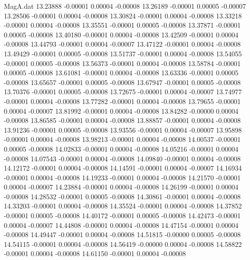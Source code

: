 \begin{filecontents}{MagA.dat}
  13.23888   -0.00001    0.00004   -0.00008
  13.26189   -0.00001    0.00005   -0.00007
  13.28506   -0.00001    0.00004   -0.00008
  13.30824   -0.00001    0.00004   -0.00008
  13.33218   -0.00001    0.00004   -0.00008
  13.35551   -0.00001    0.00005   -0.00008
  13.37871   -0.00001    0.00005   -0.00008
  13.40180   -0.00001    0.00004   -0.00008
  13.42509   -0.00001    0.00004   -0.00008
  13.44793   -0.00001    0.00004   -0.00007
  13.47122   -0.00001    0.00004   -0.00008
  13.49429   -0.00001    0.00005   -0.00008
  13.51737   -0.00001    0.00004   -0.00008
  13.54055   -0.00001    0.00005   -0.00008
  13.56373   -0.00001    0.00004   -0.00008
  13.58784   -0.00001    0.00005   -0.00008
  13.61081   -0.00001    0.00004   -0.00008
  13.63336   -0.00001    0.00005   -0.00008
  13.65657   -0.00001    0.00005   -0.00008
  13.67947   -0.00001    0.00005   -0.00008
  13.70376   -0.00001    0.00005   -0.00008
  13.72675   -0.00001    0.00004   -0.00007
  13.74977   -0.00001    0.00004   -0.00008
  13.77282   -0.00001    0.00004   -0.00008
  13.79655   -0.00001    0.00004   -0.00007
  13.81992   -0.00001    0.00004   -0.00008
  13.84282   -0.00000    0.00004   -0.00008
  13.86585   -0.00001    0.00004   -0.00008
  13.88857   -0.00001    0.00004   -0.00008
  13.91236   -0.00001    0.00005   -0.00008
  13.93556   -0.00001    0.00004   -0.00007
  13.95898   -0.00001    0.00004   -0.00008
  13.98213   -0.00001    0.00004   -0.00008
  14.00537   -0.00001    0.00005   -0.00008
  14.02833   -0.00001    0.00004   -0.00008
  14.05216   -0.00001    0.00004   -0.00008
  14.07543   -0.00001    0.00004   -0.00008
  14.09840   -0.00001    0.00004   -0.00008
  14.12172   -0.00001    0.00004   -0.00008
  14.14591   -0.00001    0.00004   -0.00007
  14.16934   -0.00001    0.00004   -0.00008
  14.19233   -0.00001    0.00004   -0.00008
  14.21570   -0.00001    0.00004   -0.00007
  14.23884   -0.00001    0.00004   -0.00008
  14.26199   -0.00001    0.00004   -0.00008
  14.28532   -0.00001    0.00005   -0.00008
  14.30861   -0.00001    0.00004   -0.00008
  14.33203   -0.00001    0.00004   -0.00008
  14.35524   -0.00001    0.00004   -0.00008
  14.37852   -0.00001    0.00005   -0.00008
  14.40172   -0.00001    0.00005   -0.00008
  14.42473   -0.00001    0.00004   -0.00007
  14.44808   -0.00001    0.00004   -0.00008
  14.47154   -0.00001    0.00004   -0.00008
  14.49447   -0.00001    0.00004   -0.00008
  14.51815   -0.00000    0.00005   -0.00008
  14.54115   -0.00001    0.00004   -0.00008
  14.56419   -0.00000    0.00004   -0.00008
  14.58822   -0.00001    0.00004   -0.00008
  14.61150   -0.00001    0.00004   -0.00008

\end{filecontents}
